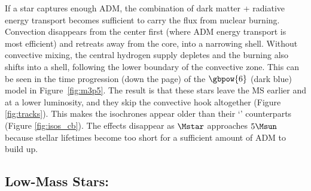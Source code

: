   If a star captures enough ADM, the combination of dark matter + radiative energy transport becomes sufficient to carry the flux from nuclear burning. Convection disappears from the center first (where ADM energy transport is most efficient) and retreats away from the core, into a narrowing shell. Without convective mixing, the central hydrogen supply depletes and the burning also shifts into a shell, following the lower boundary of the convective zone. This can be seen in the time progression (down the page) of the $\gbpow{6}$ (dark blue) model in Figure~\ref{fig:m3p5}. The result is that these stars leave the MS earlier and at a lower luminosity, and they skip the convective hook altogether (Figure \ref{fig:tracks}). This makes the isochrones appear older than their `\nodm' counterparts (Figure \ref{fig:isos_cb}).  The effects disappear as $\Mstar$ approaches $5 \Msun$ because stellar lifetimes become too short for a sufficient amount of ADM to build up.


\subsection{Low-Mass Stars: \mrangelow}
\label{sub:lowmass}


